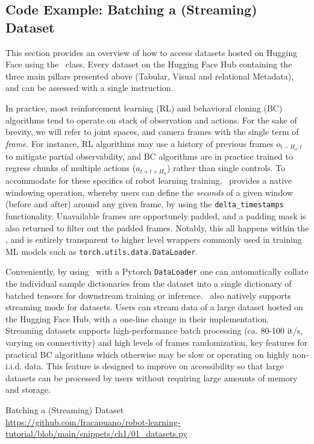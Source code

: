 \subsection{Code Example: Batching a (Streaming) Dataset}

This section provides an overview of how to access datasets hosted on Hugging Face using the \lerobotdataset~class.
Every dataset on the Hugging Face Hub containing the three main pillars presented above (Tabular, Visual and relational Metadata), and can be assessed with a single instruction.

In practice, most reinforcement learning (RL) and behavioral cloning (BC) algorithms tend to operate on stack of observation and actions.
For the sake of brevity, we will refer to joint spaces, and camera frames with the single term of \emph{frame}.
For instance, RL algorithms may use a history of previous frames \(o_{t-H_o:t} \) to mitigate partial observability, and BC algorithms are in practice trained to regress chunks of multiple actions (\(a_{t+t+H_a} \)) rather than single controls.
To accommodate for these specifics of robot learning training, \lerobotdataset~provides a native windowing operation, whereby users can define the \emph{seconds} of a given window (before and after) around any given frame, by using the \texttt{delta\_timestamps} functionality.
Unavailable frames are opportunely padded, and a padding mask is also returned to filter out the padded frames.
Notably, this all happens within the \lerobotdataset, and is entirely transparent to higher level wrappers commonly used in training ML models such as \texttt{torch.utils.data.DataLoader}.

Conveniently, by using \lerobotdataset~with a Pytorch \texttt{DataLoader} one can automatically collate the individual sample dictionaries from the dataset into a single dictionary of batched tensors for downstream training or inference.
\lerobotdataset~also natively supports streaming mode for datasets.
Users can stream data of a large dataset hosted on the Hugging Face Hub, with a one-line change in their implementation.
Streaming datasets supports high-performance batch processing (ca. 80-100 it/s, varying on connectivity) and high levels of frames randomization, key features for practical BC algorithms which otherwise may be slow or operating on highly non-i.i.d. data.
This feature is designed to improve on accessibility so that large datasets can be processed by users without requiring large amounts of memory and storage.

\begin{pbox}[label={ex:dataset-batching}]{Batching a (Streaming) Dataset \\ \url{https://github.com/fracapuano/robot-learning-tutorial/blob/main/snippets/ch1/01_datasets.py}}
    
\end{pbox}

